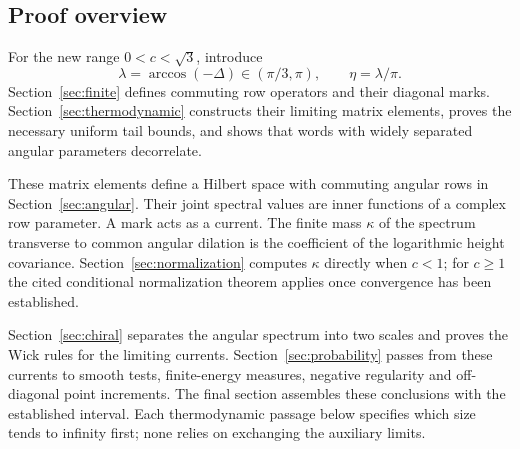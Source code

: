 \subsection{Proof overview}\label{sec:overview}

For the new range \(0<c<\sqrt3\), introduce
\[
 \lambda=\arccos(-\Delta)\in(\pi/3,\pi),
 \qquad \eta=\lambda/\pi.
\]
Section~\ref{sec:finite} defines commuting row operators and their diagonal
marks. Section~\ref{sec:thermodynamic} constructs their limiting matrix
elements, proves the necessary uniform tail bounds, and shows that words
with widely separated angular parameters decorrelate.

These matrix elements define a Hilbert space with commuting angular rows
in Section~\ref{sec:angular}. Their joint spectral values are inner functions
of a complex row parameter. A mark acts as a current. The finite mass
\(\kappa\) of the spectrum transverse to common angular dilation is the
coefficient of the logarithmic height covariance. Section~\ref{sec:normalization}
computes \(\kappa\) directly when \(c<1\); for \(c\ge1\) the cited conditional
normalization theorem applies once convergence has been established.

Section~\ref{sec:chiral} separates the angular spectrum into two scales and
proves the Wick rules for the limiting currents. Section~\ref{sec:probability}
passes from these currents to smooth tests, finite-energy measures,
negative regularity and off-diagonal point increments. The final section
assembles these conclusions with the established interval. Each
thermodynamic passage below specifies which size tends to infinity first;
none relies on exchanging the auxiliary limits.
